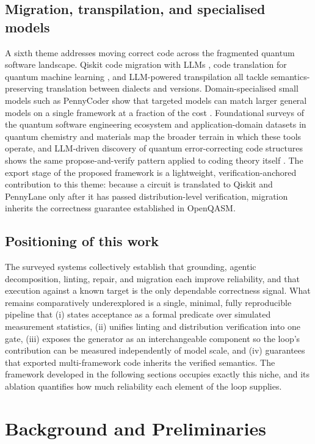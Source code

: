 \documentclass[11pt,a4paper]{article}
\begin{document}
\subsection{Migration, transpilation, and specialised models}
A sixth theme addresses moving correct code across the fragmented quantum software landscape. Qiskit code migration with LLMs \cite{ref2}, code translation for quantum machine learning \cite{ref10}, and LLM-powered transpilation \cite{ref28} all tackle semantics-preserving translation between dialects and versions. Domain-specialised small models such as PennyCoder show that targeted models can match larger general models on a single framework at a fraction of the cost \cite{ref27}. Foundational surveys of the quantum software engineering ecosystem \cite{ref15} and application-domain datasets in quantum chemistry and materials \cite{ref16,ref18} map the broader terrain in which these tools operate, and LLM-driven discovery of quantum error-correcting code structures shows the same propose-and-verify pattern applied to coding theory itself \cite{ref1}. The export stage of the proposed framework is a lightweight, verification-anchored contribution to this theme: because a circuit is translated to Qiskit and PennyLane only after it has passed distribution-level verification, migration inherits the correctness guarantee established in OpenQASM.

\subsection{Positioning of this work}
The surveyed systems collectively establish that grounding, agentic decomposition, linting, repair, and migration each improve reliability, and that execution against a known target is the only dependable correctness signal. What remains comparatively underexplored is a single, minimal, fully reproducible pipeline that (i) states acceptance as a formal predicate over simulated measurement statistics, (ii) unifies linting and distribution verification into one gate, (iii) exposes the generator as an interchangeable component so the loop's contribution can be measured independently of model scale, and (iv) guarantees that exported multi-framework code inherits the verified semantics. The framework developed in the following sections occupies exactly this niche, and its ablation quantifies how much reliability each element of the loop supplies.

\section{Background and Preliminaries}
\label{sec:background}
\end{document}
